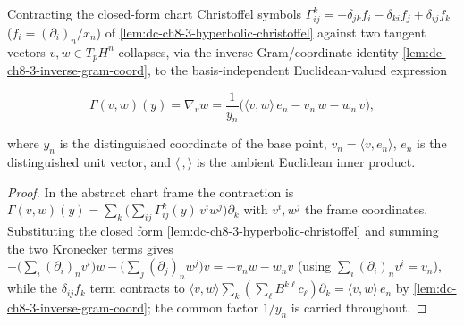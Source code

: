 \begin{lemma}
  \label{lem:dc-ch8-3-christoffel-contraction}


  Contracting the closed-form chart Christoffel symbols
  $\Gamma^k_{ij}=-\delta_{jk}f_i-\delta_{ki}f_j+\delta_{ij}f_k$
  ($f_i=(\partial_i)_n/x_n$) of \cref{lem:dc-ch8-3-hyperbolic-christoffel} against
  two tangent vectors $v,w\in T_pH^n$ collapses, via the inverse-Gram/coordinate
  identity \cref{lem:dc-ch8-3-inverse-gram-coord}, to the basis-independent
  Euclidean-valued expression

  $$
  \Gamma(v,w)(y)=\nabla_v w
    =\frac{1}{y_n}\Big(\langle v,w\rangle\, e_n-v_n\,w-w_n\,v\Big),
  $$

  where $y_n$ is the distinguished coordinate of the base point, $v_n=\langle v,e_n\rangle$,
  $e_n$ is the distinguished unit vector, and $\langle\,,\rangle$ is the ambient
  Euclidean inner product.
\end{lemma}
\begin{proof}

\sketch
  In the abstract chart frame the contraction is
  $\Gamma(v,w)(y)=\sum_k\big(\sum_{ij}\Gamma^k_{ij}(y)\,v^i w^j\big)\partial_k$ with
  $v^i,w^j$ the frame coordinates. Substituting the closed form
  \cref{lem:dc-ch8-3-hyperbolic-christoffel} and summing the two Kronecker terms
  gives $-\big(\sum_i (\partial_i)_n v^i\big)w-\big(\sum_j(\partial_j)_n w^j\big)v
  =-v_n w-w_n v$ (using $\sum_i(\partial_i)_n v^i=v_n$), while the $\delta_{ij}f_k$
  term contracts to $\langle v,w\rangle\sum_k(\sum_\ell B^{k\ell}c_\ell)\partial_k
  =\langle v,w\rangle\,e_n$ by \cref{lem:dc-ch8-3-inverse-gram-coord}; the common
  factor $1/y_n$ is carried throughout.
\end{proof}

